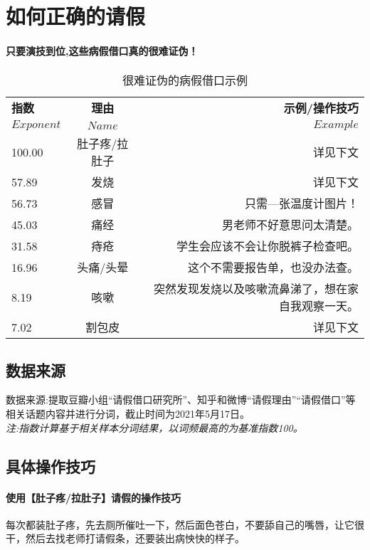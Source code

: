 \documentclass[UTF8]{ctexart}
\begin{document}
\section{如何正确的请假}
\paragraph{只要演技到位,这些病假借口真的很难证伪！}
	\begin{table}[h!]
	\begin{center}
		\caption{很难证伪的病假借口示例}
		\begin{tabular}{l|c|r}%
			\textbf{指数} & \textbf{理由} & \textbf{示例/操作技巧}\\
			$Exponent$ & $Name$ & $Example$ \\
			\hline
			100.00 & 肚子疼/拉肚子 & 详见下文\\
			57.89 & 发烧 & 详见下文\\
			56.73 & 感冒 & 只需—张温度计图片！\\
			45.03 & 痛经 & 男老师不好意思问太清楚。\\
			31.58 & 痔疮 & 学生会应该不会让你脱裤子检查吧。\\
			16.96 & 头痛/头晕 & 这个不需要报告单，也没办法查。\\
			8.19 & 咳嗽 & 突然发现发烧以及咳嗽流鼻涕了，想在家自我观察一天。\\
			7.02 & 割包皮 & 详见下文\\
		\end{tabular}
	\end{center}
\end{table}

	\subsection{数据来源}
数据来源:提取豆瓣小组“请假借口研究所”、知乎和微博“请假理由”“请假借口”等相关话题内容并进行分词，截止时间为2021年5月17日。\\
\textit{注:指数计算基于相关样本分词结果，以词频最高的为基准指数100。}
\newpage
	\subsection{具体操作技巧}
\paragraph{使用【肚子疼/拉肚子】请假的操作技巧}
每次都装肚子疼，先去厕所催吐一下，然后面色苍白，不要舔自己的嘴唇，让它很干，然后去找老师打请假条，还要装出病怏快的样子。 
\end{document}
